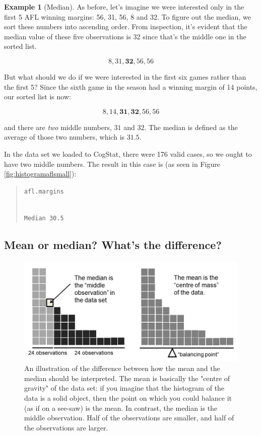 \documentclass[
]{book}
\theoremstyle{definition}
\theoremstyle{definition}
\newtheorem{example}{Example}[chapter]
\theoremstyle{definition}
\theoremstyle{definition}
\theoremstyle{remark}
\begin{document}
\begin{example}[Median]
\protect\hypertarget{exm:exmedian}{}\label{exm:exmedian}As before, let's imagine we were interested only in the first 5 AFL winning margins: 56, 31, 56, 8 and 32. To figure out the median, we sort these numbers into ascending order. From inspection, it's evident that the median value of these five observations is 32 since that's the middle one in the sorted list.

\[
8, 31, \mathbf{32}, 56, 56
\]

But what should we do if we were interested in the first six games rather than the first 5? Since the sixth game in the season had a winning margin of 14 points, our sorted list is now:

\[
8, 14, \mathbf{31}, \mathbf{32}, 56, 56
\]

and there are \emph{two} middle numbers, \(31\) and \(32\). The median is defined as the average of those two numbers, which is \(31.5\).
\end{example}

In the data set we loaded to CogStat, there were 176 valid cases, so we ought to have two middle numbers. The result in this case is (as seen in Figure \ref{fig:histogramaflsmall}):

\begin{quote}
\texttt{afl.margins}\strut \\
\texttt{Median\ 30.5}
\end{quote}

\hypertarget{mean-or-median-whats-the-difference}{%
\subsection{Mean or median? What's the difference?}\label{mean-or-median-whats-the-difference}}

\begin{figure}

{\centering \includegraphics[width=0.66\linewidth]{./resources/image/meanmedian} 

}

\caption[An illustration of the difference between how the mean and the median should be interpreted.]{An illustration of the difference between how the mean and the median should be interpreted. The mean is basically the "centre of gravity" of the data set: if you imagine that the histogram of the data is a solid object, then the point on which you could balance it (as if on a see-saw) is the mean. In contrast, the median is the middle observation. Half of the observations are smaller, and half of the observations are larger.}\label{fig:meanmedian}
\end{figure}
\end{document}
